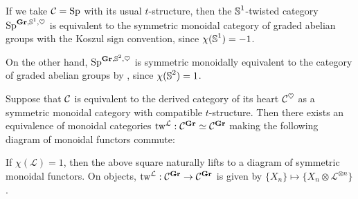 %
%
%
%

\begin{exm}
  If we take $\mathcal{C} = \operatorname{\mathrm{Sp}}$ with its usual $t$-structure, then the $\operatorname{\mathbb{S}}^1$-twisted category $\operatorname{\mathrm{Sp}}^{\operatorname{\mathbf{Gr}}, \operatorname{\mathbb{S}}^1, \heartsuit}$ is equivalent to the symmetric monoidal category of graded abelian groups with the Koszul sign convention, since $\chi(\operatorname{\mathbb{S}}^1) = -1$.

  On the other hand, $\operatorname{\mathrm{Sp}}^{\operatorname{\mathbf{Gr}}, \operatorname{\mathbb{S}}^2, \heartsuit}$ is symmetric monoidally equivalent to the category of graded abelian groups by , since $\chi(\operatorname{\mathbb{S}}^2) = 1$. 
\end{exm}
%

%

\begin{lem} \label{lem:D-twist}
  Suppose that $\mathcal{C}$ is equivalent to the derived category of its heart $\mathcal{C}^{\heartsuit}$ as a symmetric monoidal category with compatible $t$-structure. Then there exists an equivalence of monoidal categories $\mathrm{tw}^{\mathcal{L}} : \mathcal{C}^{\operatorname{\mathbf{Gr}}} \simeq \mathcal{C}^{\operatorname{\mathbf{Gr}}}$ making the following diagram of monoidal functors commute:
  \begin{center}
  \end{center}
  If $\chi(\mathcal{L}) = 1$, then the above square naturally lifts to a diagram of symmetric monoidal functors.
  On objects, $\mathrm{tw}^{\mathcal{L}} : \mathcal{C}^{\operatorname{\mathbf{Gr}}} \to \mathcal{C}^{\operatorname{\mathbf{Gr}}}$ is given by $\{X_n\} \mapsto \{X_n \otimes \mathcal{L}^{\otimes n}\}$.
\end{lem}

